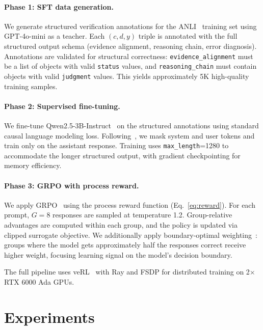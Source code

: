 \documentclass{article}
\begin{document}
\paragraph{Phase 1: SFT data generation.}
We generate structured verification annotations for the ANLI~\citep{nie2020adversarial} training set using GPT-4o-mini as a teacher.
Each $(c, d, y)$ triple is annotated with the full structured output schema (evidence alignment, reasoning chain, error diagnosis).
Annotations are validated for structural correctness: \texttt{evidence\_alignment} must be a list of objects with valid \texttt{status} values, and \texttt{reasoning\_chain} must contain objects with valid \texttt{judgment} values.
This yields approximately 5K high-quality training samples.

\paragraph{Phase 2: Supervised fine-tuning.}
We fine-tune Qwen2.5-3B-Instruct~\citep{qwen2025qwen25} on the structured annotations using standard causal language modeling loss.
Following~\citet{seo2025vtv}, we mask system and user tokens and train only on the assistant response.
Training uses \texttt{max\_length}=1280 to accommodate the longer structured output, with gradient checkpointing for memory efficiency.

\paragraph{Phase 3: GRPO with process reward.}
We apply GRPO~\citep{shao2024deepseekmath} using the process reward function (Eq.~\ref{eq:reward}).
For each prompt, $G=8$ responses are sampled at temperature 1.2.
Group-relative advantages are computed within each group, and the policy is updated via clipped surrogate objective.
We additionally apply boundary-optimal weighting~\citep{chen2025drzero}: groups where the model gets approximately half the responses correct receive higher weight, focusing learning signal on the model's decision boundary.

The full pipeline uses veRL~\citep{shao2024verl} with Ray and FSDP for distributed training on 2$\times$ RTX 6000 Ada GPUs.


\section{Experiments}
\label{sec:experiments}
\end{document}
